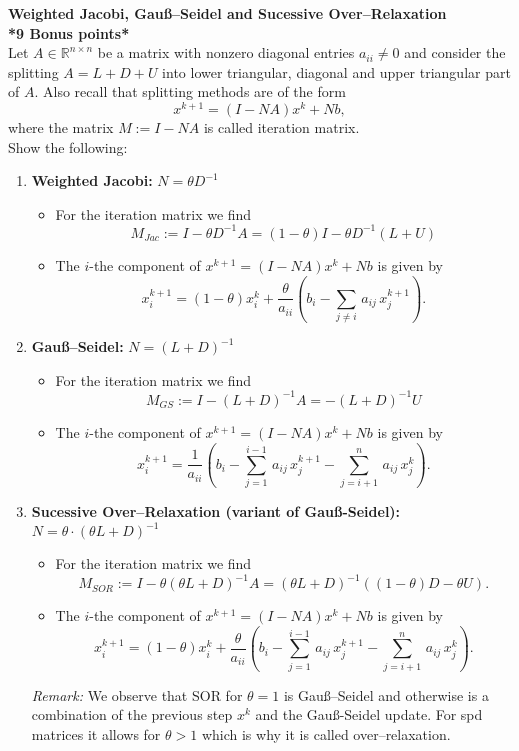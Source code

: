 \textbf{Weighted Jacobi, Gauß--Seidel and Sucessive Over--Relaxation}\\
\textbf{\color{red}*9 Bonus points*}\\Let $A\in \mathbb{R}^{n \times n}$ be a matrix with nonzero diagonal entries $a_{ii}\neq 0$ and consider the splitting $A=L+D+U$ into lower triangular, diagonal and upper triangular part of $A$. Also recall that splitting methods are of the form
$$x^{k+1} = (I-NA)x^k + Nb, $$
where the matrix $M:=I-NA$ is called iteration matrix.\\

Show the following:
\begin{enumerate}
	\item \textbf{Weighted Jacobi:} $N=\theta D^{-1}$
	\begin{itemize}
		\item For the iteration matrix we find
		$$M_{Jac} := I-\theta D^{-1}A = (1-\theta)I - \theta D^{-1}(L+U) $$
		\item The $i$-the component of $x^{k+1}=(I-NA)x^k + Nb$ is given by
		$$x^{k+1}_i = (1-\theta)x_i^k +  \frac{\theta}{a_{ii}}\left( b_i - \sum_{j\neq i} \,a_{ij} \, x_j^{k+1}\right).$$
	\end{itemize} 
	\item \textbf{Gauß--Seidel:} $N=(L+D)^{-1}$
		\begin{itemize}
		\item For the iteration matrix we find
		$$M_{GS} := I- (L+D)^{-1}A =-(L+D)^{-1}U$$
		\item The $i$-the component of $x^{k+1}=(I-NA)x^k + Nb$ is given by
		$$x^{k+1}_i =  \frac{1}{a_{ii}}\left( b_i - \sum\limits^{i-1}_{j=1} \,a_{ij} \, x_j^{k+1} -  \sum\limits^n_{j = i+1} \, a_{ij} \, x^k_j  \right).$$
	\end{itemize} 
	\item \textbf{Sucessive Over--Relaxation (variant of Gauß-Seidel):}  $N=\theta\cdot(\theta L+D)^{-1}$
		\begin{itemize}
	\item For the iteration matrix we find
	$$M_{SOR} :=I-\theta( \theta L+D )^{-1}A=(\theta L +D)^{-1} ((1-\theta)D-\theta U).$$
		\item  The $i$-the component of $x^{k+1}=(I-NA)x^k + Nb$ is given by
	$$ x^{k+1}_i = (1-\theta)x_i^k+   \frac{\theta}{a_{ii}}\left( b_i - \sum\limits^{i-1}_{j=1} \,a_{ij} \, x_j^{k+1} -  \sum\limits^n_{j = i+1} \, a_{ij} \, x^k_j  \right).$$
	\end{itemize}
{\color{navy}\textit{Remark:} We observe that SOR for $\theta = 1$ is Gauß--Seidel and otherwise is a combination of the previous step $x^k$ and the Gauß-Seidel update. For spd matrices it allows for $\theta > 1$ which is why it is called over--relaxation.}
\end{enumerate}
